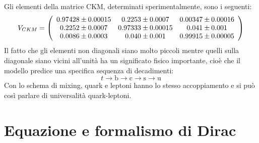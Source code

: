 \documentclass{subnucbo}
\begin{document}
Gli elementi della matrice CKM, determinati sperimentalmente, sono i seguenti:
\begin{equation}
        V _ { C K M } = \left( \begin{array} { c c c } { 0.97428 \pm 0.00015 } & { 0.2253 \pm 0.0007 } & { 0.00347 \pm 0.00016 } \\ { 0.2252 \pm 0.0007 } & { 0.97333 \pm 0.00015 } & { 0.041 \pm 0.001 } \\ { 0.0086 \pm 0.0003 } & { 0.040 \pm 0.001 } & { 0.99915 \pm 0.00005 } \end{array} \right)
        \label{eq:ckm_values}
\end{equation}
Il fatto che gli elementi non diagonali siano molto piccoli mentre quelli sulla diagonale siano vicini all'unità ha un significato fisico importante, cioè che il modello predice una specifica sequenza di decadimenti:
\begin{equation}
        t \rightarrow \mathrm { b } \rightarrow \mathrm { c } \rightarrow \mathrm { s } \rightarrow \mathrm { u }
\end{equation}
Con lo schema di mixing, quark e leptoni hanno lo stesso accoppiamento e si può così parlare di universalità quark-leptoni.



\appendix
\section{Equazione e formalismo di Dirac}
\label{app:dirac}
\end{document}
